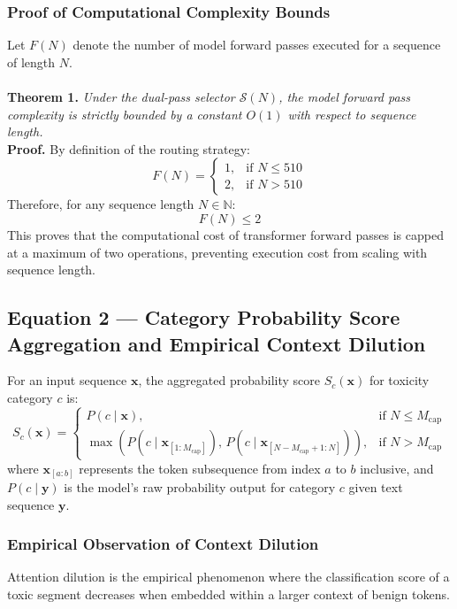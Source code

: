 \documentclass[10pt]{article}
\begin{document}
\subsubsection{Proof of Computational Complexity Bounds}
Let $F(N)$ denote the number of model forward passes executed for a sequence of length $N$.
\\
\\
\textbf{Theorem 1.} \textit{Under the dual-pass selector $\mathcal{S}(N)$, the model forward pass complexity is strictly bounded by a constant $O(1)$ with respect to sequence length.}
\\
\textbf{Proof.}
By definition of the routing strategy:
\begin{equation}
F(N) = \begin{cases} 1, & \text{if } N \le 510 \\ 2, & \text{if } N > 510 \end{cases}
\end{equation}
Therefore, for any sequence length $N \in \mathbb{N}$:
\begin{equation}
F(N) \le 2
\end{equation}
This proves that the computational cost of transformer forward passes is capped at a maximum of two operations, preventing execution cost from scaling with sequence length.

\subsection{Equation 2 --- Category Probability Score Aggregation and Empirical Context Dilution}
For an input sequence $\mathbf{x}$, the aggregated probability score $S_c(\mathbf{x})$ for toxicity category $c$ is:
\begin{equation}
\label{eq:score_aggregation}
S_c(\mathbf{x}) = \begin{cases} P(c \mid \mathbf{x}), & \text{if } N \le M_{\text{cap}} \\ \max\left( P(c \mid \mathbf{x}_{[1:M_{\text{cap}}]}), \, P(c \mid \mathbf{x}_{[N-M_{\text{cap}}+1:N]}) \right), & \text{if } N > M_{\text{cap}} \end{cases}
\end{equation}
where $\mathbf{x}_{[a:b]}$ represents the token subsequence from index $a$ to $b$ inclusive, and $P(c \mid \mathbf{y})$ is the model's raw probability output for category $c$ given text sequence $\mathbf{y}$.

\subsubsection{Empirical Observation of Context Dilution}
Attention dilution is the empirical phenomenon where the classification score of a toxic segment decreases when embedded within a larger context of benign tokens. 
\end{document}
